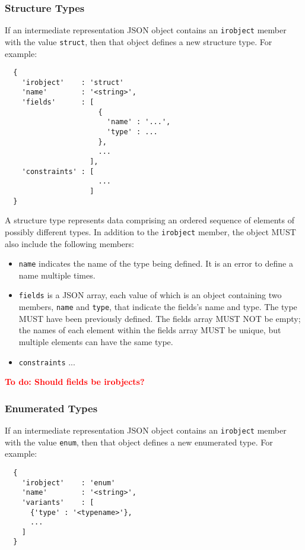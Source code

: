 \documentclass[twocolumn,a4paper]{article}
\newcommand{\todo}[1]{\textbf{\textcolor{red}{To do: #1}}}
\begin{document}
\subsubsection{Structure Types}

If an intermediate representation JSON object contains an \texttt{irobject}
member with the value \texttt{struct}, then that object defines a new
structure type. For example:

\begin{verbatim}
  {
    'irobject'    : 'struct'
    'name'        : '<string>',
    'fields'      : [
                      {
                        'name' : '...',
                        'type' : ...
                      },
                      ...
                    ],
    'constraints' : [
                      ...
                    ]
  }
\end{verbatim}

A structure type represents data comprising an ordered sequence of elements
of possibly different types. In addition to the \texttt{irobject} member, 
the object MUST also include the following members:
\begin{itemize}
  \item \texttt{name} indicates the name of the type being defined. It is
    an error to define a name multiple times.
  \item \texttt{fields} is a JSON array, each value of which is an object
    containing two members, \texttt{name} and \texttt{type}, that indicate
    the fields's name and type. The type MUST have been previously defined.
    The fields array MUST NOT be empty; the names of each element within
    the fields array MUST be unique, but multiple elements can have the
    same type.
  \item \texttt{constraints} ...
\end{itemize}

\todo{Should fields be irobjects?}

\subsubsection{Enumerated Types}

If an intermediate representation JSON object contains an \texttt{irobject}
member with the value \texttt{enum}, then that object defines a new enumerated
type. For example:

\begin{verbatim}
  {
    'irobject'    : 'enum'
    'name'        : '<string>',
    'variants'    : [
      {'type' : '<typename>'},
      ...
    ]
  }
\end{verbatim}
\end{document}
